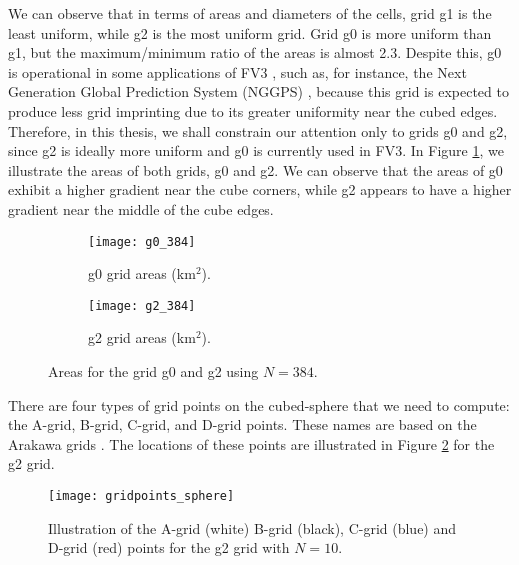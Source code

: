 We can observe that in terms of areas and diameters of the cells, grid g1 is the least uniform,
while g2 is the most uniform grid.
Grid g0 is more uniform than g1, but the maximum/minimum ratio of the areas is almost 2.3. 
Despite this, g0 is operational in some applications of FV3 \citep{harris:2021,chen:2021}, such as, for instance, 
the Next Generation Global Prediction System (NGGPS) \citep{zhou:2019}, 
because this grid is expected to produce less grid imprinting due to its greater uniformity near the cubed edges.
Therefore, in this thesis, we shall constrain our attention only to grids g0 and g2, since g2 is ideally more uniform and g0 is currently used in FV3.
In Figure \ref{chp-cs-areas}, we illustrate the areas of both grids, g0 and g2.
We can observe that the areas of g0 exhibit a higher gradient near the cube corners, while g2 appears to have a higher gradient near the middle of the cube edges.
\begin{figure}[!htb]
	\centering
	\begin{subfigure}{0.48\textwidth}
		\texttt{[image: g0\_384]}
		\caption{g0 grid areas (km$^2$).}
	\end{subfigure}
	\begin{subfigure}{0.48\textwidth}
		\centering
		\texttt{[image: g2\_384]}
		\caption{g2 grid areas (km$^2$).}
	\end{subfigure}
	\caption{Areas for the grid g0 and g2 using $N=384$.\label{chp-cs-areas}}
\end{figure}

There are four types of grid points on the cubed-sphere that we need to compute: the A-grid, B-grid, C-grid, and D-grid points.
These names are based on the Arakawa grids \citep{arakawa:1977}.
The locations of these points are illustrated in Figure \ref{chp-cs-gridpoints} for the g2 grid.
\begin{figure}[!htb]
	\centering
	\texttt{[image: gridpoints\_sphere]}
	\caption{Illustration of the A-grid (white) B-grid (black), C-grid (blue) and D-grid (red) points 
		for the g2 grid with $N=10$.\label{chp-cs-gridpoints}}
\end{figure}


